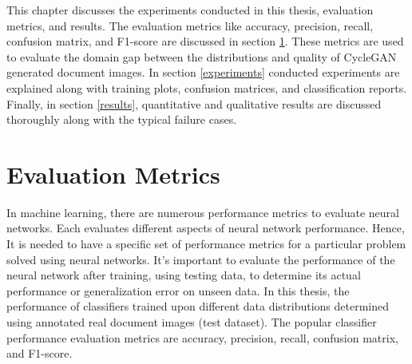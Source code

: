 \justifying
\setlength{\parskip}{1em}

This chapter discusses the experiments conducted in this thesis, evaluation metrics, and results. The evaluation metrics like accuracy, precision, recall, confusion matrix, and F1-score are discussed in section \ref{EvaluationMetrics}. These metrics are used to evaluate the domain gap between the distributions and quality of \ac{CycleGAN} generated document images. In section \ref{experiments} conducted experiments are explained along with training plots, confusion matrices, and classification reports. Finally, in section \ref{results}, quantitative and qualitative results are discussed thoroughly along with the typical failure cases.

\section{Evaluation Metrics}\label{EvaluationMetrics}


In machine learning, there are numerous performance metrics to evaluate neural networks. Each evaluates different aspects of neural network performance. Hence, It is needed to have a specific set of performance metrics for a particular problem solved using neural networks. It's important to evaluate the performance of the neural network after training, using testing data, to determine its actual performance or generalization error on unseen data. In this thesis, the performance of classifiers trained upon different data distributions determined using annotated real document images (test dataset). The popular classifier performance evaluation metrics are accuracy, precision, recall, confusion matrix, and F1-score\cite{powers2020evaluation}. 

